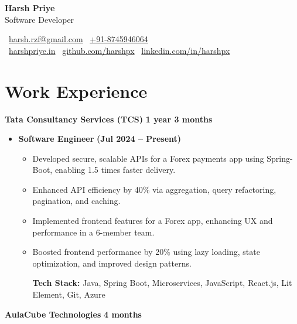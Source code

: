 \documentclass[9.5pt,a4paper]{article}
\begin{document}
\noindent
\begin{minipage}[t]{0.4\linewidth}
{\Huge \textbf{Harsh Priye}} \\[0.2em]
{\Large Software Developer}
\end{minipage}%
\hfill
\begin{minipage}[t]{0.6\linewidth}
\raggedleft
\faEnvelope~\href{mailto:harsh.rzf@gmail.com}{harsh.rzf@gmail.com} \quad 
\faPhone~\underline{+91-8745946064} \\[0.2em]
\faGlobe~\href{https://harshpriye.in}{harshpriye.in} \quad 
\faGithub~\href{https://github.com/harshpx}{github.com/harshpx} \quad
\faLinkedin~\href{https://linkedin.com/in/harshpx}{linkedin.com/in/harshpx}
\end{minipage}


\section*{Work Experience}
\noindent \textbf{Tata Consultancy Services (TCS)} \hfill \textbf{1 year 3 months} \\
\vspace*{-1em}
\begin{itemize}[left=0.4cm, itemsep=0pt, topsep=0pt, partopsep=0pt]
    \item \textbf{Software Engineer} \hfill \textbf{(Jul 2024 -- Present)}
    \begin{itemize}[left=0cm, itemsep=0pt, topsep=-1pt, partopsep=0pt]
      \setlength{\rightskip}{0.05\textwidth}
      \item Developed secure, scalable APIs for a Forex payments app using Spring-Boot, enabling 1.5 times faster delivery.
      \item Enhanced API efficiency by 40\% via aggregation, query refactoring, pagination, and caching.
      \item Implemented frontend features for a Forex app, enhancing UX and performance in a 6-member team.
      \item Boosted frontend performance by 20\% using lazy loading, state optimization, and improved design patterns.
      \begin{adjustwidth}{-1.2em}{0pt}
        \textbf{Tech Stack:} Java, Spring Boot, Microservices, JavaScript, React.js, Lit Element, Git, Azure
      \end{adjustwidth}
    \end{itemize}
\end{itemize}
\vspace*{0.6em}
\noindent \textbf{AulaCube Technologies } \hfill \textbf{4 months} \\
\end{document}
